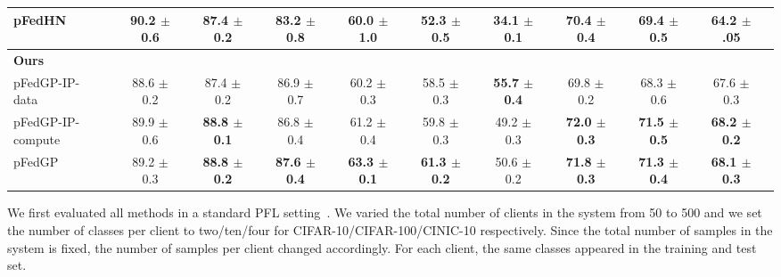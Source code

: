 \documentclass{article}
\begin{document}
\begin{table*}[!t]
{\begin{tabular}{l c cc cc cc c cc cc cc c cc cc}
    pFedHN \cite{shamsian2021personalized_icml} && \textbf{90.2 $\pm$ 0.6} && 87.4 $\pm$ 0.2 && 83.2 $\pm$ 0.8 && 60.0 $\pm$ 1.0 && 52.3 $\pm$ 0.5 && 34.1 $\pm$ 0.1 && 70.4 $\pm$ 0.4 && 69.4 $\pm$ 0.5 && 64.2 $\pm$ .05 \\
    \midrule
    \textbf{Ours} && && && && && && && && &&\\
    pFedGP-IP-data && 88.6 $\pm$ 0.2 && 87.4 $\pm$ 0.2 && 86.9 $\pm$ 0.7 && 60.2 $\pm$ 0.3 && 58.5 $\pm$ 0.3 && \textbf{55.7 $\pm$ 0.4} && 69.8 $\pm$ 0.2 && 68.3 $\pm$ 0.6 && 67.6 $\pm$ 0.3 \\
    pFedGP-IP-compute && 89.9 $\pm$ 0.6 && \textbf{88.8 $\pm$ 0.1} && 86.8 $\pm$ 0.4 && 61.2 $\pm$ 0.4 && 59.8 $\pm$ 0.3 && 49.2 $\pm$ 0.3 && \textbf{72.0 $\pm$ 0.3} && \textbf{71.5 $\pm$ 0.5} && \textbf{68.2 $\pm$ 0.2} \\
    pFedGP &&  89.2 $\pm$ 0.3 && \textbf{88.8 $\pm$ 0.2} && \textbf{87.6 $\pm$ 0.4} && \textbf{63.3 $\pm$ 0.1} && \textbf{61.3 $\pm$ 0.2} && 50.6 $\pm$ 0.2 && \textbf{71.8 $\pm$ 0.3} && \textbf{71.3 $\pm$ 0.4} && \textbf{68.1 $\pm$ 0.3} \\
    \bottomrule
    \end{tabular}
}
\label{tab:1}
\end{table*}
We first evaluated all methods in a standard PFL setting~\cite{shamsian2021personalized_icml, t2020personalized}.
We varied the total number of clients in the system from 50 to 500 and we set the number of classes per client to two/ten/four for CIFAR-10/CIFAR-100/CINIC-10 respectively. Since the total number of samples in the system is fixed, the number of samples per client changed accordingly.
For each client, the same classes appeared in the training and test set.  
\end{document}
